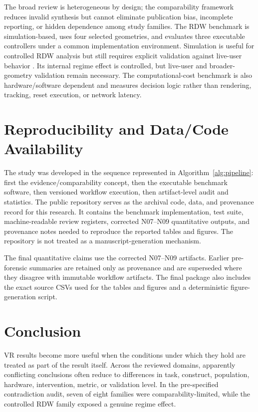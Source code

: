 The broad review is heterogeneous by design; the comparability framework reduces invalid synthesis but cannot eliminate publication bias, incomplete reporting, or hidden dependence among study families. The RDW benchmark is simulation-based, uses four selected geometries, and evaluates three executable controllers under a common implementation environment. Simulation is useful for controlled RDW analysis but still requires explicit validation against live-user behavior \cite{Hodgson2013FourApproaches,Azmandian2022SimulationValidation,Hirt2022Chaotic}. Its internal regime effect is controlled, but live-user and broader-geometry validation remain necessary. The computational-cost benchmark is also hardware/software dependent and measures decision logic rather than rendering, tracking, reset execution, or network latency.

\section{Reproducibility and Data/Code Availability}
The study was developed in the sequence represented in Algorithm~\ref{alg:pipeline}: first the evidence/comparability concept, then the executable benchmark software, then versioned workflow execution, then artifact-level audit and statistics. The public \repo{} repository serves as the archival code, data, and provenance record for this research. It contains the benchmark implementation, test suite, machine-readable review registers, corrected N07--N09 quantitative outputs, and provenance notes needed to reproduce the reported tables and figures. The repository is not treated as a manuscript-generation mechanism.

The final quantitative claims use the corrected N07--N09 artifacts. Earlier pre-forensic summaries are retained only as provenance and are superseded where they disagree with immutable workflow artifacts. The final package also includes the exact source CSVs used for the tables and figures and a deterministic figure-generation script.

\section{Conclusion}
VR results become more useful when the conditions under which they hold are treated as part of the result itself. Across the reviewed domains, apparently conflicting conclusions often reduce to differences in task, construct, population, hardware, intervention, metric, or validation level. In the pre-specified contradiction audit, seven of eight families were comparability-limited, while the controlled RDW family exposed a genuine regime effect.

